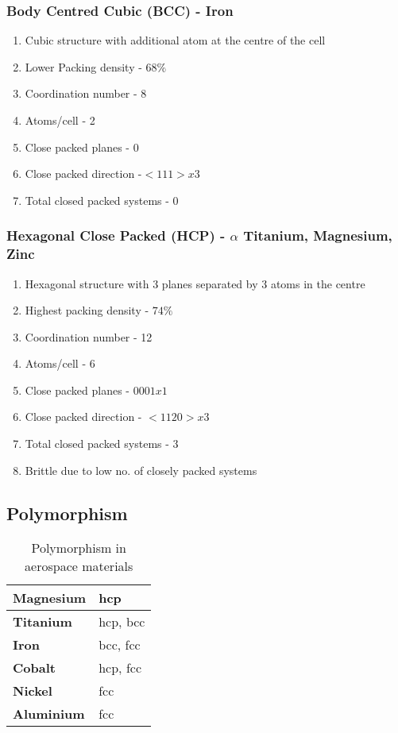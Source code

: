 \subsubsection{Body Centred Cubic (BCC) - Iron}
\begin{enumerate}
  \item Cubic structure with additional atom at the centre of the cell
  \item Lower Packing density - $68\%$
  \item Coordination number - 8
  \item Atoms/cell - 2
  \item Close packed planes - 0
  \item Close packed direction -$ <111> x 3$
  \item Total closed packed systems - 0
\end{enumerate}

\subsubsection{Hexagonal Close Packed (HCP) - $\alpha$ Titanium, Magnesium, Zinc}
\begin{enumerate}
  \item Hexagonal structure with 3 planes separated by 3 atoms in the centre
  \item Highest packing density - $74\%$
  \item Coordination number - 12
  \item Atoms/cell - 6
  \item Close packed planes - ${0001} x 1$
  \item Close packed direction - $<1120> x 3$
  \item Total closed packed systems - 3
  \item Brittle due to low no. of closely packed systems
\end{enumerate}

\subsection{Polymorphism}

\begin{table}[h!]
\centering
\caption{Polymorphism in aerospace materials}
\label{polymorphism-metals}
\begin{tabular}{|l|l|}
\hline
\textbf{Magnesium} & hcp      \\ \hline
\textbf{Titanium}  & hcp, bcc \\ \hline
\textbf{Iron}      & bcc, fcc \\ \hline
\textbf{Cobalt}    & hcp, fcc \\ \hline
\textbf{Nickel}    & fcc      \\ \hline
\textbf{Aluminium} & fcc      \\ \hline
\end{tabular}
\end{table}

